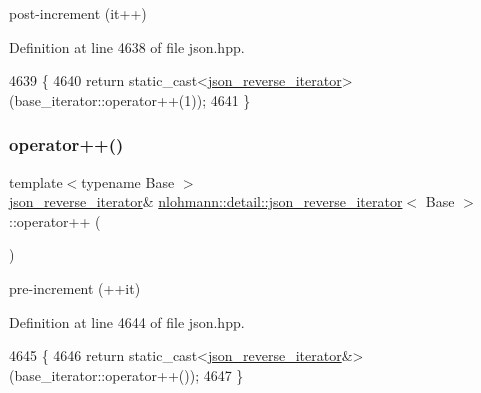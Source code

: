 post-\/increment (it++) 



Definition at line 4638 of file json.\+hpp.


\begin{DoxyCode}
4639     \{
4640         \textcolor{keywordflow}{return} \textcolor{keyword}{static\_cast<}\hyperlink{classnlohmann_1_1detail_1_1json__reverse__iterator_a0246de16ece16293f2917dfa5d96e278}{json\_reverse\_iterator}\textcolor{keyword}{>}(base\_iterator::operator++(1));
4641     \}
\end{DoxyCode}
\mbox{\label{classnlohmann_1_1detail_1_1json__reverse__iterator_a26caf0069a50ce4ecb010a1453e883fc}} 
\subsubsection{\texorpdfstring{operator++()}{operator++()}\hspace{0.1cm}{\footnotesize\ttfamily [2/2]}}
{\footnotesize\ttfamily template$<$typename Base $>$ \\
\hyperlink{classnlohmann_1_1detail_1_1json__reverse__iterator}{json\+\_\+reverse\+\_\+iterator}\& \hyperlink{classnlohmann_1_1detail_1_1json__reverse__iterator}{nlohmann\+::detail\+::json\+\_\+reverse\+\_\+iterator}$<$ Base $>$\+::operator++ (\begin{DoxyParamCaption}{ }\end{DoxyParamCaption})\hspace{0.3cm}{\ttfamily [inline]}}



pre-\/increment (++it) 



Definition at line 4644 of file json.\+hpp.


\begin{DoxyCode}
4645     \{
4646         \textcolor{keywordflow}{return} \textcolor{keyword}{static\_cast<}\hyperlink{classnlohmann_1_1detail_1_1json__reverse__iterator_a0246de16ece16293f2917dfa5d96e278}{json\_reverse\_iterator}&\textcolor{keyword}{>}(base\_iterator::operator++());
4647     \}
\end{DoxyCode}
\mbox{\label{classnlohmann_1_1detail_1_1json__reverse__iterator_a4e5d0a3bee433104ef87366e00536e01}} 

